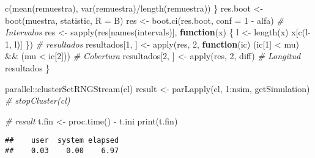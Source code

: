 \documentclass[
]{book}
\newenvironment{Shaded}{\begin{snugshade}}{\end{snugshade}}
\newcommand{\AttributeTok}[1]{\textcolor[rgb]{0.77,0.63,0.00}{#1}}
\newcommand{\CommentTok}[1]{\textcolor[rgb]{0.56,0.35,0.01}{\textit{#1}}}
\newcommand{\ControlFlowTok}[1]{\textcolor[rgb]{0.13,0.29,0.53}{\textbf{#1}}}
\newcommand{\DecValTok}[1]{\textcolor[rgb]{0.00,0.00,0.81}{#1}}
\newcommand{\FunctionTok}[1]{\textcolor[rgb]{0.00,0.00,0.00}{#1}}
\newcommand{\NormalTok}[1]{#1}
\newcommand{\OtherTok}[1]{\textcolor[rgb]{0.56,0.35,0.01}{#1}}
\newcommand{\SpecialCharTok}[1]{\textcolor[rgb]{0.00,0.00,0.00}{#1}}
\theoremstyle{break}
\theoremstyle{definition}
\theoremstyle{definition}
\theoremstyle{definition}
\theoremstyle{definition}
\theoremstyle{remark}
\begin{document}
\begin{Shaded}
\begin{Highlighting}[]
      \FunctionTok{c}\NormalTok{(}\FunctionTok{mean}\NormalTok{(remuestra), }\FunctionTok{var}\NormalTok{(remuestra)}\SpecialCharTok{/}\FunctionTok{length}\NormalTok{(remuestra))}
\NormalTok{    \}}
\NormalTok{    res.boot }\OtherTok{\textless{}{-}} \FunctionTok{boot}\NormalTok{(muestra, statistic, }\AttributeTok{R =}\NormalTok{ B)}
\NormalTok{    res }\OtherTok{\textless{}{-}} \FunctionTok{boot.ci}\NormalTok{(res.boot, }\AttributeTok{conf =} \DecValTok{1} \SpecialCharTok{{-}}\NormalTok{ alfa)}
    \CommentTok{\# Intervalos}
\NormalTok{    res }\OtherTok{\textless{}{-}} \FunctionTok{sapply}\NormalTok{(res[}\FunctionTok{names}\NormalTok{(intervals)], }\ControlFlowTok{function}\NormalTok{(x) \{}
\NormalTok{      l }\OtherTok{\textless{}{-}} \FunctionTok{length}\NormalTok{(x)}
\NormalTok{      x[}\FunctionTok{c}\NormalTok{(l}\DecValTok{{-}1}\NormalTok{, l)]}
\NormalTok{    \})}
    \CommentTok{\# resultados}
\NormalTok{    resultados[}\DecValTok{1}\NormalTok{, ] }\OtherTok{\textless{}{-}} \FunctionTok{apply}\NormalTok{(res, }\DecValTok{2}\NormalTok{,}
                                   \ControlFlowTok{function}\NormalTok{(ic) (ic[}\DecValTok{1}\NormalTok{] }\SpecialCharTok{\textless{}}\NormalTok{ mu) }\SpecialCharTok{\&\&}\NormalTok{ (mu }\SpecialCharTok{\textless{}}\NormalTok{ ic[}\DecValTok{2}\NormalTok{])) }\CommentTok{\# Cobertura}
\NormalTok{    resultados[}\DecValTok{2}\NormalTok{, ] }\OtherTok{\textless{}{-}} \FunctionTok{apply}\NormalTok{(res, }\DecValTok{2}\NormalTok{, diff) }\CommentTok{\# Longitud}
\NormalTok{    resultados}
\NormalTok{\}}

\NormalTok{parallel}\SpecialCharTok{::}\FunctionTok{clusterSetRNGStream}\NormalTok{(cl)}
\NormalTok{result }\OtherTok{\textless{}{-}} \FunctionTok{parLapply}\NormalTok{(cl, }\DecValTok{1}\SpecialCharTok{:}\NormalTok{nsim, getSimulation)}
\CommentTok{\# stopCluster(cl)}

\CommentTok{\# result}
\NormalTok{t.fin }\OtherTok{\textless{}{-}} \FunctionTok{proc.time}\NormalTok{() }\SpecialCharTok{{-}}\NormalTok{ t.ini}
\FunctionTok{print}\NormalTok{(t.fin)}
\end{Highlighting}
\end{Shaded}

\begin{verbatim}
##    user  system elapsed 
##    0.03    0.00    6.97
\end{verbatim}
\end{document}
